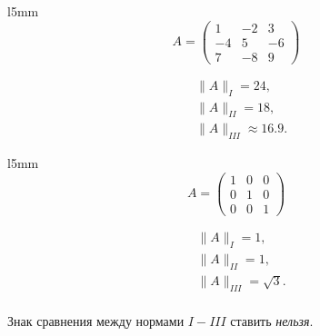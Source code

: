 \documentclass[a4paper,11pt]{article}
\begin{document}
\begin{minipage}{1\linewidth}
  \begin{wraptable}{l}{5mm}
    \begin{equation*}
      A = \begin{pmatrix}
        1 & -2 & 3 \\
        -4 & 5 & -6 \\
        7 & -8 & 9
      \end{pmatrix}
    \end{equation*}
  \end{wraptable}
  \begin{align*}
    &\parallel A\parallel_I = 24, \\
    &\parallel A\parallel_{II} = 18, \\
    &\parallel A\parallel_{III} \approx 16.9.
  \end{align*}
  \begin{wraptable}{l}{5mm}
    \begin{equation*}
      A = \begin{pmatrix}
        1 & 0 & 0 \\
        0 & 1 & 0 \\
        0 & 0 & 1
      \end{pmatrix}
    \end{equation*}
  \end{wraptable}
  \begin{align*}
    &\parallel A\parallel_I = 1, \\
    &\parallel A\parallel_{II} = 1, \\
    &\parallel A\parallel_{III} = \sqrt{3}.\\
  \end{align*}
\end{minipage}
\begin{center}
  Знак сравнения между нормами $I-III$ ставить \textit{нельзя}.
\end{center}
\end{document}
